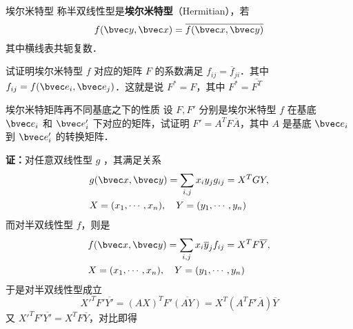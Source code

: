 
\begin{definition}{埃尔米特型}
称半双线性型是\textbf{埃尔米特型}（Hermitian），若
\begin{equation}\label{HeFor_eq2}
f(\bvec y,\bvec x)=\overline{f(\bvec x,\bvec y)}
\end{equation}
其中横线表共轭复数．
\end{definition}
\begin{example}{}
试证明埃尔米特型 $f$ 对应的矩阵 $F$ 的系数满足 $f_{ij}=\overline f_{ji}$．其中 $f_{ij}=f(\bvec e_i,\bvec e_j)$．这就是说 $F^*=F$，其中 $F^*=\overline {F^T}$
\end{example}
\begin{example}{埃尔米特矩阵再不同基底之下的性质}
设 $F,F'$ 分别是埃尔米特型 $f$ 在基底 $\bvec e_i$ 和 $\bvec e'_i$ 下对应的矩阵，试证明 $F'=A^TF\overline A$，其中 $A$ 是基底 $\bvec e_i$ 到 $\bvec e'_i$ 的转换矩阵．

\textbf{证：}对任意双线性型 $g$ ，其满足关系
\begin{equation}
\begin{aligned}
&g(\bvec x,\bvec y)=\sum_{i,j}x_i y_j g_{ij}=X^TGY,\\
&X=(x_1,\cdots,x_n),\quad Y=(y_1,\cdots,y_n)
\end{aligned}
\end{equation}
而对半双线性型 $f$，则是
\begin{equation}\label{HeFor_eq1}
\begin{aligned}
&f(\bvec x,\bvec y)=\sum_{i,j}x_i \overline y_j f_{ij}=X^TF\overline Y,\\
&X=(x_1,\cdots,x_n),\quad Y=(y_1,\cdots,y_n)
\end{aligned}
\end{equation}
于是对半双线性型成立
\begin{equation}
X'^TF'\overline{Y'}=(AX)^TF'\overline{(AY)}=X^T(A^TF'\overline A)\overline Y
\end{equation}
又 $X'^TF'\overline{Y'}=X^T F\overline Y$，对比即得


 
\end{example}